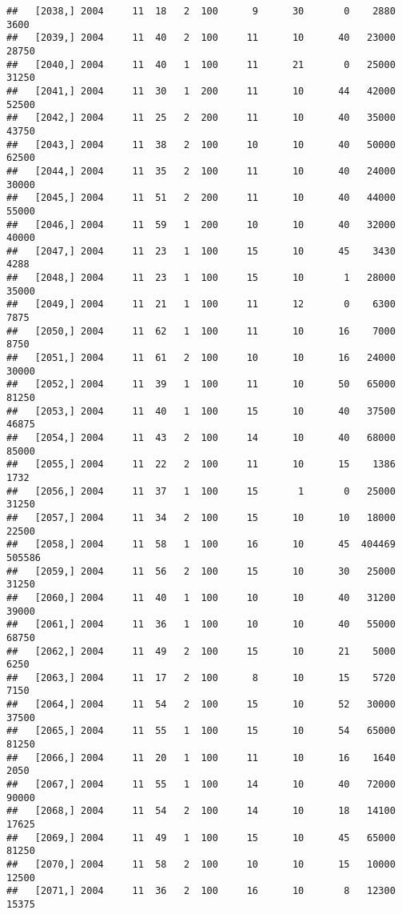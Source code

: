 \documentclass{article}\usepackage[]{graphicx}\usepackage[]{color}
\makeatletter
\newenvironment{kframe}{%
 \def\at@end@of@kframe{}%
 \ifinner\ifhmode%
  \def\at@end@of@kframe{\end{minipage}}%
  \begin{minipage}{\columnwidth}%
 \fi\fi%
 \def\FrameCommand##1{\hskip\@totalleftmargin \hskip-\fboxsep
 \colorbox{shadecolor}{##1}\hskip-\fboxsep
     \hskip-\linewidth \hskip-\@totalleftmargin \hskip\columnwidth}%
 \MakeFramed {\advance\hsize-\width
   \@totalleftmargin\z@ \linewidth\hsize
   \@setminipage}}%
 {\par\unskip\endMakeFramed%
 \at@end@of@kframe}
\newenvironment{knitrout}{}{} %
\makeatother
\begin{document}
\begin{knitrout}
\begin{kframe}
\begin{verbatim}
##   [2038,] 2004     11  18   2  100      9      30       0    2880    3600
##   [2039,] 2004     11  40   2  100     11      10      40   23000   28750
##   [2040,] 2004     11  40   1  100     11      21       0   25000   31250
##   [2041,] 2004     11  30   1  200     11      10      44   42000   52500
##   [2042,] 2004     11  25   2  200     11      10      40   35000   43750
##   [2043,] 2004     11  38   2  100     10      10      40   50000   62500
##   [2044,] 2004     11  35   2  100     11      10      40   24000   30000
##   [2045,] 2004     11  51   2  200     11      10      40   44000   55000
##   [2046,] 2004     11  59   1  200     10      10      40   32000   40000
##   [2047,] 2004     11  23   1  100     15      10      45    3430    4288
##   [2048,] 2004     11  23   1  100     15      10       1   28000   35000
##   [2049,] 2004     11  21   1  100     11      12       0    6300    7875
##   [2050,] 2004     11  62   1  100     11      10      16    7000    8750
##   [2051,] 2004     11  61   2  100     10      10      16   24000   30000
##   [2052,] 2004     11  39   1  100     11      10      50   65000   81250
##   [2053,] 2004     11  40   1  100     15      10      40   37500   46875
##   [2054,] 2004     11  43   2  100     14      10      40   68000   85000
##   [2055,] 2004     11  22   2  100     11      10      15    1386    1732
##   [2056,] 2004     11  37   1  100     15       1       0   25000   31250
##   [2057,] 2004     11  34   2  100     15      10      10   18000   22500
##   [2058,] 2004     11  58   1  100     16      10      45  404469  505586
##   [2059,] 2004     11  56   2  100     15      10      30   25000   31250
##   [2060,] 2004     11  40   1  100     10      10      40   31200   39000
##   [2061,] 2004     11  36   1  100     10      10      40   55000   68750
##   [2062,] 2004     11  49   2  100     15      10      21    5000    6250
##   [2063,] 2004     11  17   2  100      8      10      15    5720    7150
##   [2064,] 2004     11  54   2  100     15      10      52   30000   37500
##   [2065,] 2004     11  55   1  100     15      10      54   65000   81250
##   [2066,] 2004     11  20   1  100     11      10      16    1640    2050
##   [2067,] 2004     11  55   1  100     14      10      40   72000   90000
##   [2068,] 2004     11  54   2  100     14      10      18   14100   17625
##   [2069,] 2004     11  49   1  100     15      10      45   65000   81250
##   [2070,] 2004     11  58   2  100     10      10      15   10000   12500
##   [2071,] 2004     11  36   2  100     16      10       8   12300   15375

\end{verbatim}
\end{kframe}
\end{knitrout}
\end{document}
